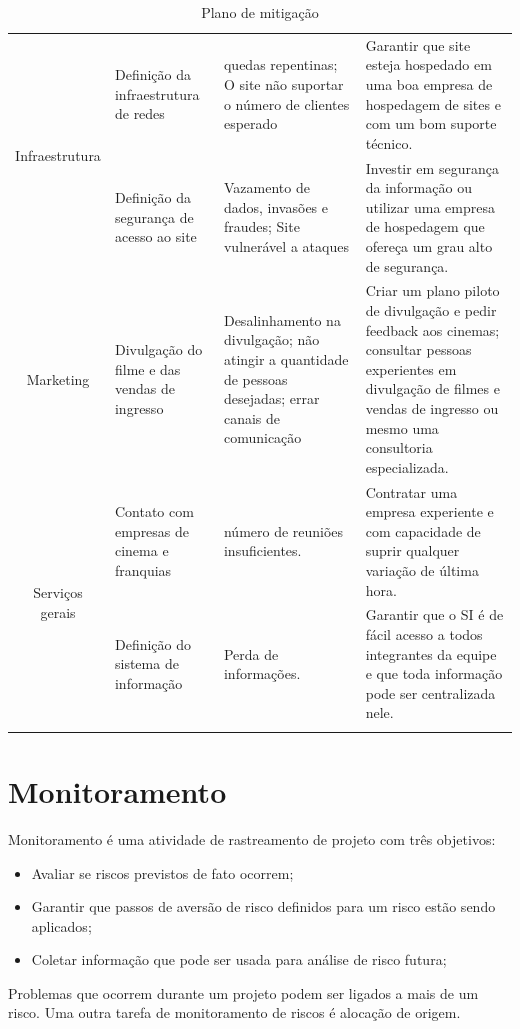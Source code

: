\documentclass[12pt]{article}
\begin{document}
\begin{center}
\begin{longtable}{|c|p{2.5cm}|p{4cm}|p{4cm}|}
            \multirow{2}{*}{Infraestrutura} & Definição da infraestrutura de redes & quedas repentinas; O site não suportar o número de clientes esperado & Garantir que site esteja hospedado em uma boa empresa de hospedagem de sites e com um bom suporte técnico. \\ \cline{2-4} 
                     
            & Definição da segurança de acesso ao site & Vazamento de dados, invasões e fraudes; Site vulnerável a ataques & Investir em segurança da informação ou utilizar uma empresa de hospedagem que ofereça um grau alto de segurança.\\ \hline
            
            Marketing & Divulgação do filme e das vendas de ingresso & Desalinhamento na divulgação; não atingir a quantidade de pessoas desejadas; errar canais de comunicação & Criar um plano piloto de divulgação e pedir feedback aos cinemas; consultar pessoas experientes em divulgação de filmes e vendas de ingresso ou mesmo uma consultoria especializada.\\ \hline
            
            \multirow{2}{*}{Serviços gerais}& Contato com empresas de cinema e franquias & número de reuniões insuficientes. & Contratar uma empresa experiente e com capacidade de suprir qualquer variação de última hora. \\ \cline{2-4}
            
            & Definição do sistema de informação & Perda de informações. & Garantir que o SI é de fácil acesso a todos integrantes da equipe e que toda informação pode ser centralizada nele.\\ \hline
         
            \caption{Plano de mitigação}
            \label{table:Mitigacao}
        \end{longtable}
    \end{center}

        
        
    \section{Monitoramento}
            Monitoramento é uma atividade de rastreamento de projeto com três objetivos:
             \begin{itemize}
               \item Avaliar se riscos previstos de fato ocorrem;
               \item Garantir que passos de aversão de risco definidos para um risco estão sendo aplicados;
                \item Coletar informação que pode ser usada para análise de risco futura;
             \end{itemize}
        Problemas que ocorrem durante um projeto podem ser ligados a mais de um risco. Uma outra tarefa de monitoramento de riscos é alocação de origem.
        
\end{document}
